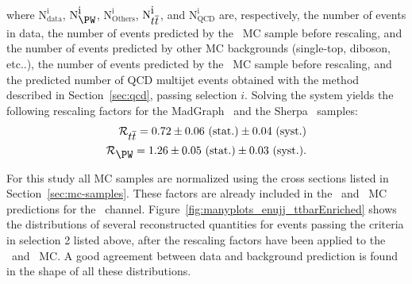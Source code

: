 where $\mbox{N}_{\mbox{data}}^{\mbox{i}}$, $\mbox{N}_{\mbox{\PW}}^{\mbox{i}}$, $\mbox{N}_{\mbox{Others}}^{\mbox{i}}$, 
$\mbox{N}_{\mbox{$t\overline{t}$}}^{\mbox{i}}$, and  $\mbox{N}_{\mbox{QCD}}^{\mbox{i}}$
are, respectively, the number of events in data, the number of events predicted by the \wjets~MC sample before rescaling,
and the number of events predicted by other MC backgrounds (single-top, diboson, etc..),
the number of events predicted by the \ttbar~MC sample before rescaling, 
and the predicted number of QCD multijet events obtained with the method described in Section~\ref{sec:qcd}, passing selection $i$.
Solving the system yields the following rescaling factors for the {\sc MadGraph} \ttbar~and the {\sc Sherpa} \wjets~samples:
\begin{eqnarray}
\mathcal{R}_{\mbox{\ttbar}} = \mbox{\rescaleFactorTTBARenujj}  \\
\mathcal{R}_{\mbox{\PW}} = \mbox{\rescaleFactorWSherpa} .
\end{eqnarray}

For this study all MC samples are normalized using the cross sections listed in Section~\ref{sec:mc-samples}. 
These factors are already included in the \ttbar~and \wjets~MC predictions for the \enujj~channel.
Figure~\ref{fig:manyplots_enujj_ttbarEnriched} shows the distributions of several reconstructed 
quantities for events passing the criteria in selection 2 listed above, after the rescaling factors have been 
applied to the \wjets~and \ttbar~MC. 
A good agreement between data and background prediction is found in the shape of all these distributions.  


